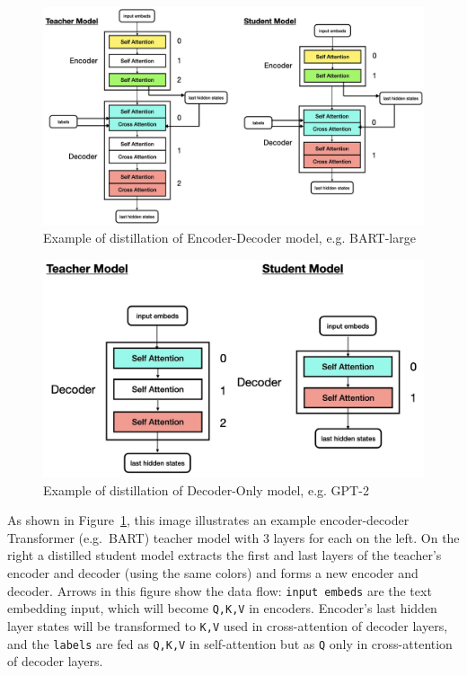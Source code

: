 \begin{figure}[hbpt]
    \centering
    \includegraphics[width=0.9\linewidth]{images/0.001}
    \caption{Example of distillation of Encoder-Decoder model, e.g. BART-large}
    \label{fig:sub1}
\end{figure}

\begin{figure}[hbpt]
    \centering
    \includegraphics[width=0.9\linewidth]{images/0.002}
    \caption{Example of distillation of Decoder-Only model, e.g. GPT-2}
    \label{fig:sub2}
\end{figure}

As shown in Figure~\ref{fig:sub1}, this image illustrates an example encoder-decoder Transformer (e.g.\ BART) teacher model with 3 layers for each on the left.
On the right a distilled student model extracts the first and last layers of the teacher's encoder and decoder (using the same colors) and forms a new encoder and decoder.
Arrows in this figure show the data flow: \texttt{input embeds} are the text embedding input, which will become \texttt{Q,K,V} in encoders.
Encoder's last hidden layer states will be transformed to \texttt{K,V} used in cross-attention of decoder layers, and the \texttt{labels} are fed as \texttt{Q,K,V}
in self-attention but as \texttt{Q} only in cross-attention of decoder layers.

